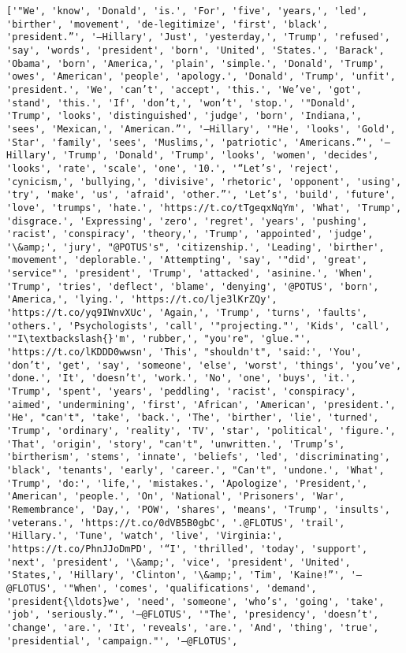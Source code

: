 \documentclass[11pt]{article}
\begin{document}
    \begin{Verbatim}[commandchars=\\\{\}]
['"We', 'know', 'Donald', 'is.', 'For', 'five', 'years,', 'led', 'birther', 'movement', 'de-legitimize', 'first', 'black', 'president.”', '—Hillary', 'Just', 'yesterday,', 'Trump', 'refused', 'say', 'words', 'president', 'born', 'United', 'States.', 'Barack', 'Obama', 'born', 'America,', 'plain', 'simple.', 'Donald', 'Trump', 'owes', 'American', 'people', 'apology.', 'Donald', 'Trump', 'unfit', 'president.', 'We', 'can’t', 'accept', 'this.', 'We’ve', 'got', 'stand', 'this.', 'If', 'don’t,', 'won’t', 'stop.', '"Donald', 'Trump', 'looks', 'distinguished', 'judge', 'born', 'Indiana,', 'sees', 'Mexican,', 'American.”', '—Hillary', '"He', 'looks', 'Gold', 'Star', 'family', 'sees', 'Muslims,', 'patriotic', 'Americans.”', '—Hillary', 'Trump', 'Donald', 'Trump', 'looks', 'women', 'decides', 'looks', 'rate', 'scale', 'one', '10.', '“Let’s', 'reject', 'cynicism,', 'bullying,', 'divisive', 'rhetoric', 'opponent', 'using', 'try', 'make', 'us', 'afraid', 'other.”', 'Let’s', 'build', 'future', 'love', 'trumps', 'hate.', 'https://t.co/tTgeqxNqYm', 'What', 'Trump', 'disgrace.', 'Expressing', 'zero', 'regret', 'years', 'pushing', 'racist', 'conspiracy', 'theory,', 'Trump', 'appointed', 'judge', '\&amp;', 'jury', "@POTUS's", 'citizenship.', 'Leading', 'birther', 'movement', 'deplorable.', 'Attempting', 'say', '"did', 'great', 'service"', 'president', 'Trump', 'attacked', 'asinine.', 'When', 'Trump', 'tries', 'deflect', 'blame', 'denying', '@POTUS', 'born', 'America,', 'lying.', 'https://t.co/lje3lKrZQy', 'https://t.co/yq9IWnvXUc', 'Again,', 'Trump', 'turns', 'faults', 'others.', 'Psychologists', 'call', '"projecting."', 'Kids', 'call', '"I\textbackslash{}'m', 'rubber,', "you're", 'glue."', 'https://t.co/lKDDD0wwsn', 'This', "shouldn't", 'said:', 'You', 'don’t', 'get', 'say', 'someone', 'else', 'worst', 'things', 'you’ve', 'done.', 'It', 'doesn’t', 'work.', 'No', 'one', 'buys', 'it.', 'Trump', 'spent', 'years', 'peddling', 'racist', 'conspiracy', 'aimed', 'undermining', 'first', 'African', 'American', 'president.', 'He', "can't", 'take', 'back.', 'The', 'birther', 'lie', 'turned', 'Trump', 'ordinary', 'reality', 'TV', 'star', 'political', 'figure.', 'That', 'origin', 'story', "can't", 'unwritten.', 'Trump’s', 'birtherism', 'stems', 'innate', 'beliefs', 'led', 'discriminating', 'black', 'tenants', 'early', 'career.', "Can't", 'undone.', 'What', 'Trump', 'do:', 'life,', 'mistakes.', 'Apologize', 'President,', 'American', 'people.', 'On', 'National', 'Prisoners', 'War', 'Remembrance', 'Day,', 'POW', 'shares', 'means', 'Trump', 'insults', 'veterans.', 'https://t.co/0dVB5B0gbC', '.@FLOTUS', 'trail', 'Hillary.', 'Tune', 'watch', 'live', 'Virginia:', 'https://t.co/PhnJJoDmPD', '“I', 'thrilled', 'today', 'support', 'next', 'president', '\&amp;', 'vice', 'president', 'United', 'States,', 'Hillary', 'Clinton', '\&amp;', 'Tim', 'Kaine!”', '—@FLOTUS', '"When', 'comes', 'qualifications', 'demand', 'president{\ldots}we', 'need', 'someone', 'who’s', 'going', 'take', 'job', 'seriously.”', '—@FLOTUS', '"The', 'presidency', 'doesn’t', 'change', 'are.', 'It', 'reveals', 'are.', 'And', 'thing', 'true', 'presidential', 'campaign."', '—@FLOTUS', 
\end{Verbatim}
\end{document}
